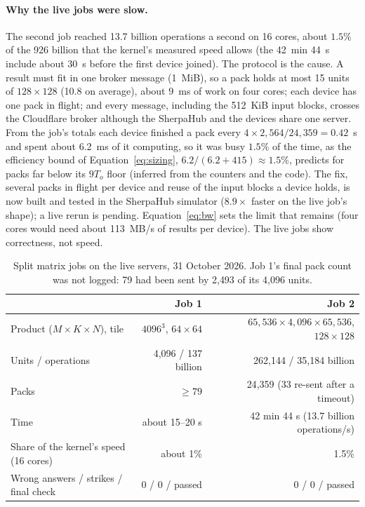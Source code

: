 \documentclass[11pt,a4paper]{article}
\theoremstyle{definition}
\theoremstyle{plain}
\begin{document}
\paragraph{Why the live jobs were slow.} The second job reached 13.7 billion operations a second on 16 cores,
about $1.5\%$ of the 926 billion that the kernel's measured speed allows (the 42~min 44~s include about 30~s
before the first device joined). The protocol is the cause. A result must fit in one broker message
(1~MiB), so a pack holds at most 15 units of $128\times128$ (10.8 on average), about 9~ms of work on four cores;
each device has one pack in flight; and every message, including the 512~KiB input blocks, crosses the Cloudflare
broker although the SherpaHub and the devices share one server. From the job's totals each device finished a pack
every $4\times2{,}564/24{,}359=0.42$~s and spent about 6.2~ms of it computing, so it was busy $1.5\%$ of the
time, as the efficiency bound of Equation~\eqref{eq:sizing}, $6.2/(6.2+415)\approx1.5\%$, predicts for packs far
below its $9T_o$ floor (inferred from the counters and the code). The fix, several packs in flight per device and reuse of
the input blocks a device holds, is now built and tested in the SherpaHub simulator ($8.9\times$ faster on the
live job's shape); a live rerun is pending. Equation~\eqref{eq:bw} sets the limit that remains (four cores would
need about 113~MB/s of results per device). The live jobs show correctness, not speed.

\begin{table}[ht]
\centering
\caption{Split matrix jobs on the live servers, 31 October 2026. Job 1's final pack count was not logged: 79 had
been sent by 2{,}493 of its 4{,}096 units.}\label{tab:split-live}
\small
\begin{tabular}{@{}lrr@{}}
\toprule
 & \textbf{Job 1} & \textbf{Job 2} \\
\midrule
Product ($M\times K\times N$), tile & $4096^3$, $64\times64$ & $65{,}536\times4{,}096\times65{,}536$, $128\times128$ \\
Units / operations & 4{,}096 / 137 billion & 262{,}144 / 35{,}184 billion \\
Packs & $\ge79$ & 24{,}359 (33 re-sent after a timeout) \\
Time & about 15--20 s & 42 min 44 s (13.7 billion operations/s) \\
Share of the kernel's speed (16 cores) & about 1\% & 1.5\% \\
Wrong answers / strikes / final check & 0 / 0 / passed & 0 / 0 / passed \\
\bottomrule
\end{tabular}
\end{table}
\end{document}
